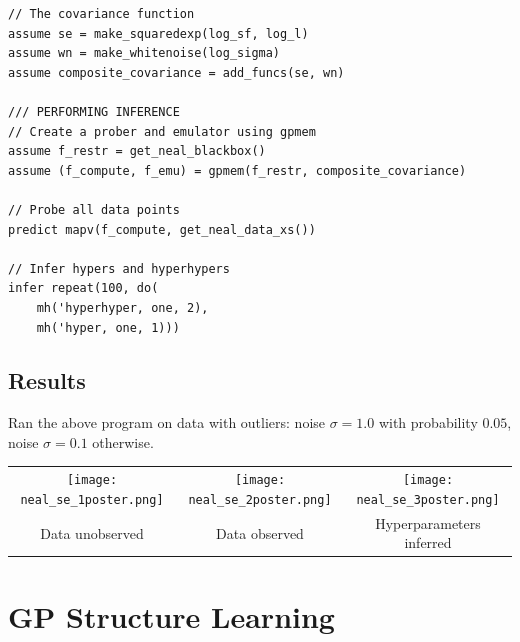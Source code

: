 \documentclass[a0,portrait]{a0poster}
\begin{document}
\begin{multicols}{3}
\begin{minipage}{\linewidth}
\begin{lstlisting}[frame=single,mathescape,label=alg:gphierarch,basicstyle=\fontsize{20}{22}\selectfont\ttfamily]
// The covariance function
assume se = make_squaredexp(log_sf, log_l)
assume wn = make_whitenoise(log_sigma)
assume composite_covariance = add_funcs(se, wn)

/// PERFORMING INFERENCE
// Create a prober and emulator using gpmem
assume f_restr = get_neal_blackbox()
assume (f_compute, f_emu) = gpmem(f_restr, composite_covariance)

// Probe all data points
predict mapv(f_compute, get_neal_data_xs())

// Infer hypers and hyperhypers
infer repeat(100, do(
    mh('hyperhyper, one, 2),
    mh('hyper, one, 1)))

\end{lstlisting}
\end{minipage}
\subsection*{Results}
Ran the above program on data with outliers: noise $\sigma = 1.0$ with probability $0.05$, noise $\sigma = 0.1$ otherwise.
\begin{center}
\begin{tabular}{ccc}
  \texttt{[image: neal\_se\_1poster.png]}&
  \texttt{[image: neal\_se\_2poster.png]}&
  \texttt{[image: neal\_se\_3poster.png]}\\
  Data unobserved &
  Data observed &
  Hyperparameters inferred
\end{tabular}
\end{center}



%


\section*{GP Structure Learning}


\end{multicols}
\end{document}
